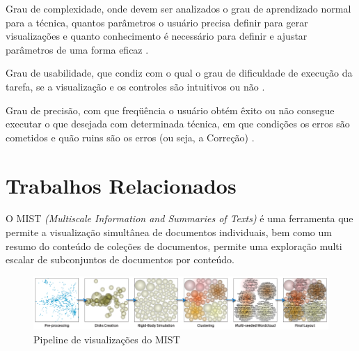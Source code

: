 Grau de complexidade, onde devem ser analizados o grau de aprendizado normal para a técnica, quantos parâmetros o usuário precisa definir para gerar visualizações e quanto conhecimento é necessário para definir e ajustar parâmetros de uma forma eficaz \cite{ward2015interactive}.

Grau de usabilidade, que condiz com o qual o grau de dificuldade de execução da tarefa, se a visualização e os controles são intuitivos ou não \cite{ward2015interactive}.

Grau de precisão, com que freqüência o usuário obtém êxito ou não consegue executar o que desejada com determinada técnica, em que condições os erros são cometidos e quão ruins são os erros (ou seja, a Correção) \cite{ward2015interactive}.


\section{Trabalhos Relacionados}
\label{Trab_Relac}

O MIST \textit{(Multiscale Information and Summaries of Texts)} é uma ferramenta que permite a visualização simultânea de documentos individuais, bem como um resumo do conteúdo de coleções de documentos, permite uma exploração multi escalar de subconjuntos de documentos por conteúdo\cite{pagliosa2013mist}. 


\begin{figure}[!ht]
	\centering
	\includegraphics[width=1\columnwidth]{images/mist_pipeline.png}
	\caption{Pipeline de visualizações do MIST \cite{pagliosa2013mist}}
	\label{fig:MISTpipeline}
\end{figure}

